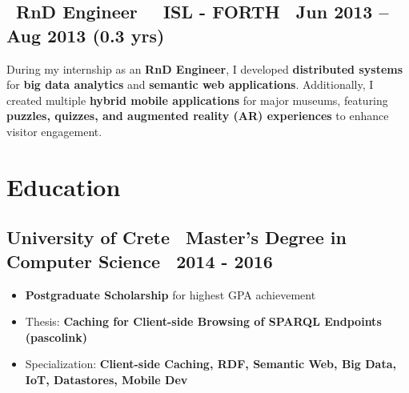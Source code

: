 \documentclass[a4paper,10pt]{article}
\begin{document}
\vspace{1pt}


\subsection*{\faBriefcase\ \textbf{RnD Engineer} \textbar\ \faBuilding\ ISL - FORTH \hfill \faCalendar\ Jun 2013 – Aug 2013 (0.3 yrs)}
\vspace{1pt}
\begin{adjustwidth}{1em}{1em}
During my internship as an \textbf{RnD Engineer}, I developed \textbf{distributed systems} for \textbf{big data analytics} and \textbf{semantic web applications}. Additionally, I created multiple \textbf{hybrid mobile applications} for major museums, featuring \textbf{puzzles, quizzes, and augmented reality (AR) experiences} to enhance visitor engagement.
\end{adjustwidth}

\vspace{1pt}


\section*{ Education}

\subsection*{ University of Crete \textbar\ Master's Degree in Computer Science \textbar\ 2014 - 2016}

\begin{adjustwidth}{1em}{1em}
    \begin{itemize}[left=0pt]
        \item \textbf{Postgraduate Scholarship} for highest GPA achievement
        \item Thesis: \textbf{Caching for Client-side Browsing of SPARQL Endpoints (pascolink)}
        \item Specialization: \textbf{Client-side Caching, RDF, Semantic Web, Big Data, IoT, Datastores, Mobile Dev}
    \end{itemize}
\end{adjustwidth}
\end{document}
